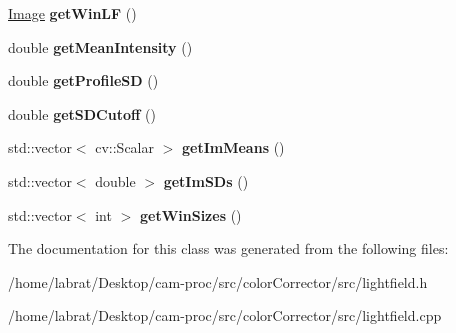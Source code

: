\begin{DoxyCompactItemize}
\item 
\hyperlink{classImage}{Image} {\bfseries get\+Win\+LF} ()\hypertarget{classLightfield_a1e2333a695147bd472dbfc869ca20c18}{}\label{classLightfield_a1e2333a695147bd472dbfc869ca20c18}

\item 
double {\bfseries get\+Mean\+Intensity} ()\hypertarget{classLightfield_a6a2b000243cf11ae70d7239f459d6a66}{}\label{classLightfield_a6a2b000243cf11ae70d7239f459d6a66}

\item 
double {\bfseries get\+Profile\+SD} ()\hypertarget{classLightfield_ac683a8188858ff4e59a5cade56cbfbb5}{}\label{classLightfield_ac683a8188858ff4e59a5cade56cbfbb5}

\item 
double {\bfseries get\+S\+D\+Cutoff} ()\hypertarget{classLightfield_ae067ae7e0711e9355370be009510bf57}{}\label{classLightfield_ae067ae7e0711e9355370be009510bf57}

\item 
std\+::vector$<$ cv\+::\+Scalar $>$ {\bfseries get\+Im\+Means} ()\hypertarget{classLightfield_a901089b01f9107e28ad35008299df133}{}\label{classLightfield_a901089b01f9107e28ad35008299df133}

\item 
std\+::vector$<$ double $>$ {\bfseries get\+Im\+S\+Ds} ()\hypertarget{classLightfield_a21811dcec4b34a9ee27647fa66730ebd}{}\label{classLightfield_a21811dcec4b34a9ee27647fa66730ebd}

\item 
std\+::vector$<$ int $>$ {\bfseries get\+Win\+Sizes} ()\hypertarget{classLightfield_a0d8e36cdc7dde3f23fa5f0d98448f528}{}\label{classLightfield_a0d8e36cdc7dde3f23fa5f0d98448f528}

\end{DoxyCompactItemize}


The documentation for this class was generated from the following files\+:\begin{DoxyCompactItemize}
\item 
/home/labrat/\+Desktop/cam-\/proc/src/color\+Corrector/src/lightfield.\+h\item 
/home/labrat/\+Desktop/cam-\/proc/src/color\+Corrector/src/lightfield.\+cpp\end{DoxyCompactItemize}
